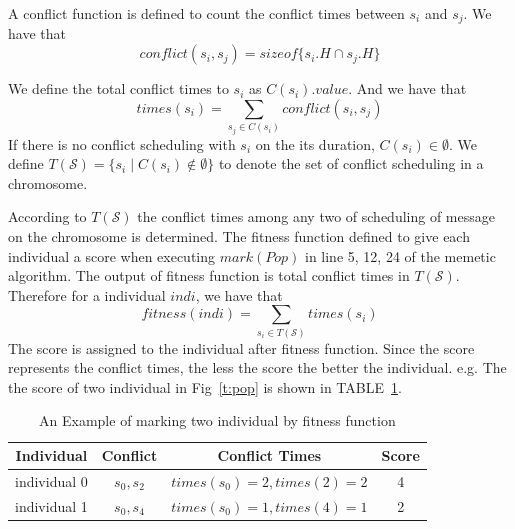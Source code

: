 \documentclass[journal]{IEEEtran}
\newcommand{\calS}{\mathcal{S}}
\begin{document}
A conflict function is defined to count the conflict times between $s_i$ and $s_j$.
We have that
\begin{equation}
	conflict(s_i,s_j) = sizeof \{s_i.H \cap s_j.H\}
\end{equation}

We define the total conflict times to $s_{i}$ as $C(s_i).value$. And we have that
\begin{equation}
	times(s_i)=\sum_{ s_j \in C(s_i) } conflict(s_i,s_j)
\end{equation}
If there is no conflict scheduling with $s_i$ on the its duration,
 $C(s_i)\in \emptyset$.
We define $T(\calS) = \{ s_i \mid C(s_i) \notin \emptyset \} $ to denote the set of conflict scheduling in a chromosome.

According to $T(\calS)$ the conflict times among any two of scheduling of message on the chromosome is determined.
The fitness function defined to give each individual a score when executing $mark(Pop)$ in line 5, 12, 24 of the memetic algorithm.
The output of fitness function is total conflict times in $T(\calS)$.
Therefore for a individual $indi$, we have that
\begin{equation}
	fitness(indi)=\sum_{s_i \in T(\calS)} {times(s_i)}
\end{equation}
The score is assigned to the individual after fitness function.
Since the score represents the conflict times, the less the score the better the individual.
e.g. The the score of two individual in Fig~\ref{t:pop} is shown in TABLE~\ref{t:fitness}. 

\begin{table}[!t]
	\renewcommand{\arraystretch}{1.3}
	\caption{An Example of marking two individual by fitness function}
	\label{t:fitness}
	\centering
	\begin{tabular}{|c||c||c||c|}
		\hline
		\textbf{Individual} & \textbf{Conflict} &\textbf{Conflict Times} &\textbf{Score}\\
		\hline 
		individual 0 &$s_0,s_2$ & $times(s_0)=2,times(2)=2$ &4\\
		\hline
		individual 1 & $s_0,s_4$& $times(s_0)=1,times(4)=1$ &2\\
		\hline
		\end{tabular}	
\end{table}
\end{document}

